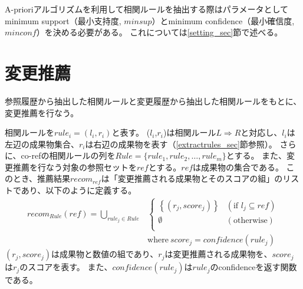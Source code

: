 \documentclass[a4paper]{jsbook}
\def\Ra{\Rightarrow}
\newcommand{\minconf}{mincon\!f}
\newcommand{\confidence}{con\!f\!idence}
\begin{document}
A-prioriアルゴリズムを利用して相関ルールを抽出する際はパラメータとしてminimum support（最小支持度, $minsup$）とminimum confidence（最小確信度, $\minconf$）を決める必要がある。
これについては\ref{setting_sec}節で述べる。

\section{変更推薦}\label{ranking_sec}
参照履歴から抽出した相関ルールと変更履歴から抽出した相関ルールをもとに、
変更推薦を行なう。

相関ルールを$rule_i = (l_i,r_i)$と表す。
($l_i$,$r_i$)は相関ルール$L \Ra R$と対応し、$l_i$は左辺の成果物集合、$r_i$は右辺の成果物を表す（\ref{extractrules_sec}節参照）。
さらに、co-refの相関ルールの列を$Rule = \{rule_1, rule_2, \dots, rule_m\}$とする。
また、変更推薦を行なう対象の参照セットを$ref$とする。$ref$は成果物の集合である。
このとき、推薦結果$recom_{ref}$は「変更推薦される成果物とそのスコアの組」のリストであり、以下のように定義する。
\begin{eqnarray}
  recom_{Rule}\left(ref\right) = \bigcup_{rule_j \in Rule}
    &\left\{
    \begin{array}{ll}
      \left\{\left(r_j,score_j \right)\right\} &(\textrm{if~} l_j \subseteq ref) \\
      \emptyset &(\textrm{otherwise})\\
    \end{array}
    \right.\\
    &\textrm{where}~score_j = \confidence(rule_j)\nonumber
\end{eqnarray}
$\left(r_j,score_j\right)$は成果物と数値の組であり、$r_j$は変更推薦される成果物を、$score_j$は$r_j$のスコアを表す。
また、$\confidence(rule_j)$は$rule_j$のconfidenceを返す関数である。
\end{document}
